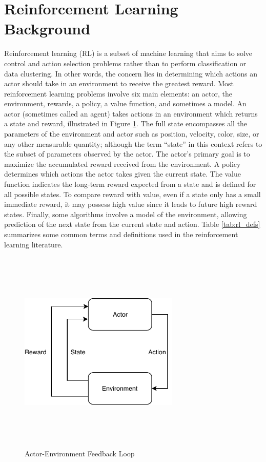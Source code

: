 \section{Reinforcement Learning Background}
Reinforcement learning (RL) is a subset of machine learning that aims to solve control and action selection problems rather than to perform classification or data clustering. In other words, the concern lies in determining which actions an actor should take in an environment to receive the greatest reward. Most reinforcement learning problems involve six main elements: an actor, the environment, rewards, a policy, a value function, and sometimes a model. An actor (sometimes called an agent) takes actions in an environment which returns a state and reward, illustrated in Figure \ref{fig:actor_env_loop}. The full state encompasses all the parameters of the environment and actor such as position, velocity, color, size, or any other measurable quantity; although the term ``state'' in this context refers to the subset of parameters observed by the actor. The actor's primary goal is to maximize the accumulated reward received from the environment. A policy determines which actions the actor takes given the current state. The value function indicates the long-term reward expected from a state and is defined for all possible states. To compare reward with value, even if a state only has a small immediate reward, it may possess high value since it leads to future high reward states. Finally, some algorithms involve a model of the environment, allowing prediction of the next state from the current state and action. Table \ref{tab:rl_defs} summarizes some common terms and definitions used in the reinforcement learning literature.
\begin{figure}[H]   %
	\centering \includegraphics[width=3in, height=3.85in, keepaspectratio]{figures/actor_env_loop.pdf}
	\caption{Actor-Environment Feedback Loop}\label{fig:actor_env_loop}
\end{figure}

